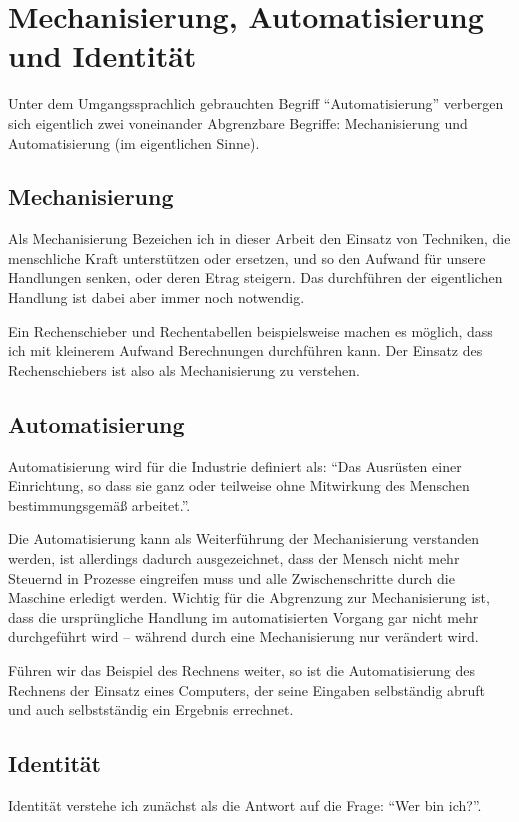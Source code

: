\section {Mechanisierung, Automatisierung und Identität}

Unter dem Umgangssprachlich gebrauchten Begriff \enquote{Automatisierung} verbergen sich eigentlich zwei voneinander Abgrenzbare Begriffe: Mechanisierung und Automatisierung (im eigentlichen Sinne).

\subsection {Mechanisierung}

Als Mechanisierung Bezeichen ich in dieser Arbeit den Einsatz von Techniken, die menschliche Kraft unterstützen oder ersetzen, und so den Aufwand für unsere Handlungen senken, oder deren Etrag steigern.
Das durchführen der eigentlichen Handlung ist dabei aber immer noch notwendig.

Ein Rechenschieber und Rechentabellen beispielsweise machen es möglich, dass ich mit kleinerem Aufwand Berechnungen durchführen kann.
Der Einsatz des Rechenschiebers ist also als Mechanisierung zu verstehen.

\subsection {Automatisierung}

Automatisierung wird für die Industrie definiert als: \enquote{Das Ausrüsten einer Einrichtung, so dass sie ganz oder teilweise ohne Mitwirkung des Menschen bestimmungsgemäß arbeitet.}\parencite{din19233}.

Die Automatisierung kann als Weiterführung der Mechanisierung verstanden werden\parencite{ulrich}, ist allerdings dadurch ausgezeichnet, dass der Mensch nicht mehr Steuernd in Prozesse eingreifen muss und alle Zwischenschritte durch die Maschine erledigt werden.
Wichtig für die Abgrenzung zur Mechanisierung ist, dass die ursprüngliche Handlung im automatisierten Vorgang gar nicht mehr durchgeführt wird – während durch eine Mechanisierung nur verändert wird.


Führen wir das Beispiel des Rechnens weiter, so ist die Automatisierung des Rechnens der Einsatz eines Computers, der seine Eingaben selbständig abruft und auch selbstständig ein Ergebnis errechnet.

\subsection {Identität}
Identität verstehe ich zunächst als die Antwort auf die Frage: \enquote{Wer bin ich?}.

